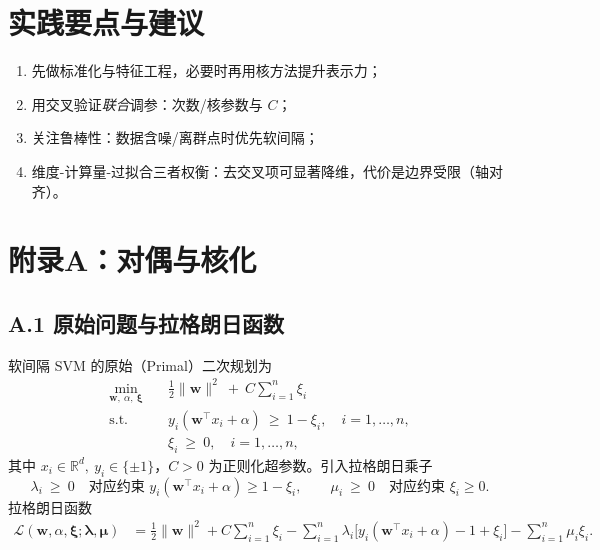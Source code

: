 \documentclass[10.5pt,hyperref,a4paper,UTF8]{ctexart}
\theoremstyle{definition}
\begin{document}
\section{实践要点与建议}
\begin{enumerate}
  \item 先做标准化与特征工程，必要时再用核方法提升表示力；
  \item 用交叉验证\emph{联合}调参：次数/核参数与 \(C\)；
  \item 关注鲁棒性：数据含噪/离群点时优先软间隔；
  \item 维度-计算量-过拟合三者权衡：去交叉项可显著降维，代价是边界受限（轴对齐）。
\end{enumerate}

\section*{附录A：对偶与核化}

\subsection*{A.1 原始问题与拉格朗日函数}
软间隔 SVM 的原始（Primal）二次规划为
\begin{equation}\label{eq:primal_full}
\begin{aligned}
\min_{\bm w,\ \alpha,\ \bm\xi}\quad & \frac{1}{2}\|\bm w\|^2 \ +\ C\sum_{i=1}^n \xi_i\\
\text{s.t.}\quad & y_i(\bm w^\top x_i + \alpha)\ \ge\ 1-\xi_i,\quad i=1,\dots,n,\\
& \xi_i \ \ge\ 0,\quad i=1,\dots,n,
\end{aligned}
\end{equation}
其中 $x_i\in\mathbb{R}^d,\ y_i\in\{\pm1\}$，$C>0$ 为正则化超参数。引入拉格朗日乘子
\[
\lambda_i\ \ge\ 0\quad \text{对应约束 } y_i(\bm w^\top x_i+\alpha)\ge 1-\xi_i,\qquad
\mu_i\ \ge\ 0\quad \text{对应约束 } \xi_i\ge 0.
\]
拉格朗日函数
\begin{align}
\mathcal{L}(\bm w,\alpha,\bm\xi;\bm\lambda,\bm\mu)
&=\frac{1}{2}\|\bm w\|^2 + C\sum_{i=1}^n \xi_i
- \sum_{i=1}^n \lambda_i\bigl[y_i(\bm w^\top x_i+\alpha)-1+\xi_i\bigr]
- \sum_{i=1}^n \mu_i \xi_i.\label{eq:Lagrangian}
\end{align}
\end{document}

